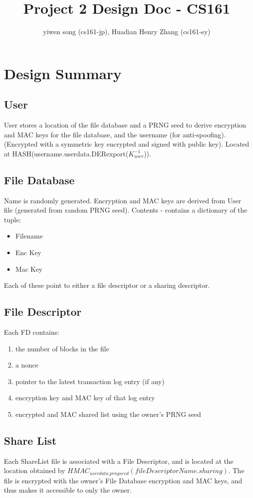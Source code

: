 \documentclass{article}
\title{Project 2 Design Doc - CS161}
\author{yiwen song (cs161-jp), Huadian Henry Zhang (cs161-sy)}
\date{}
\begin{document}
\maketitle

\section{Design Summary}
\subsection{User}
User stores a location of the file database and a PRNG seed to derive encryption and MAC keys for the file
database, and the username (for anti-spoofing). 
(Encrypted with a symmetric key encrypted and signed with public key).
Located at HASH(username.userdata.DERexport($K_{user}^{-1}$)).

\subsection{File Database}
Name is randomly generated.
Encryption and MAC keys are derived from User file (generated from random PRNG seed).
Contents - contains a dictionary of the tuple:
\begin{itemize}
\item Filename
\item Enc Key
\item Mac Key
\end{itemize}
Each of these point to either a file descriptor or a sharing descriptor.

\subsection{File Descriptor}
Each FD contains:
\begin{enumerate}
\item the number of blocks in the file
\item a nonce
\item pointer to the latest transaction log entry (if any)
\item encryption key and MAC key of that log entry
\item encrypted and MAC shared list using the owner's PRNG seed
\end{enumerate}

\subsection{Share List}
Each ShareList file is associated with a File Descriptor, and is located at the location obtained by $HMAC_{userdata.prngseed}(fileDescriptorName.sharing)$. The file is encrypted with the owner's File Database encryption and MAC keys, and thus makes it accessible to only the owner.
\end{document}
